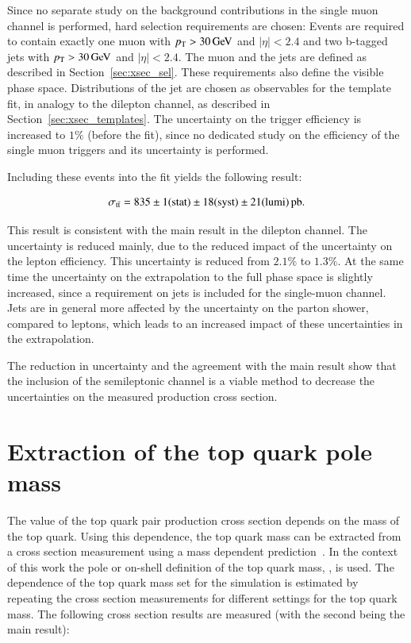 Since no separate study on the background contributions in the single muon channel is performed, hard selection requirements are chosen:
Events are required to contain exactly one muon with $p_{\mathrm{T}} > 30 \,\text{Ge\hspace{-.08em}V}$ and $|\eta| < 2.4$ and two b-tagged jets with $p_{\mathrm{T}} > 30 \,\text{Ge\hspace{-.08em}V}$ and $|\eta| < 2.4$.
The muon and the jets are defined as described in Section~\ref{sec:xsec_sel}.
These requirements also define the visible phase space.
Distributions of the jet \pt are chosen as observables for the template fit, in analogy to the dilepton channel, as described in Section~\ref{sec:xsec_templates}.
The uncertainty on the trigger efficiency is increased to $1\%$ (before the fit), since no dedicated study on the efficiency of the single muon triggers and its uncertainty is performed.

Including these events into the fit yields the following result:

\begin{equation}
\sigma_{\mathrm{t}\bar{\mathrm{t}}} = 835 \pm  1 ({\rm stat}) \pm  18({\rm syst}) \pm 21 ({\rm lumi}) \mbox{\ensuremath{\,\text{pb}}}.
\end{equation}

This result is consistent with the main result in the dilepton channel.
The uncertainty is reduced mainly, due to the reduced impact of the uncertainty on the lepton efficiency. This
uncertainty is reduced from $2.1\%$ to $1.3\%$. At the same time the uncertainty on the extrapolation to the full phase space is slightly increased, since a requirement
on jets is included for the single-muon channel. Jets are in general more affected by the uncertainty on the parton shower, compared to leptons, which leads to an increased
impact of these uncertainties in the extrapolation.

The reduction in uncertainty and the agreement with the main result show that the inclusion of the semileptonic channel is a viable method to decrease the uncertainties on the measured
\ttbar production cross section.


\section{Extraction of the top quark pole mass}
\label{sec:res_mass}

The value of the top quark pair production cross section depends on the mass of the top quark. Using this dependence, the top quark mass can be extracted from a \ttbar cross section measurement using a mass dependent prediction~\cite{Khachatryan:2016mqs}.
In the context of this work the pole or on-shell definition of the top quark mass, \mtp, is used.  
The dependence of the top quark mass set for the simulation is estimated by repeating the \ttbar cross section measurements for different settings for the top quark mass.
The following cross section results are measured (with the second being the main result):

